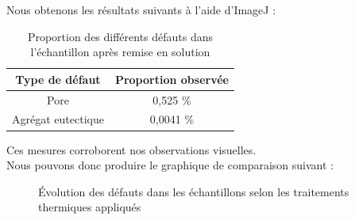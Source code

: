 Nous obtenons les résultats suivants à l'aide d'ImageJ :

\begin{table}[H]
    \centering
    \caption{Proportion des différents défauts dans l'échantillon après remise en solution}
    \begin{tabular}{c|c}
        \textbf{Type de défaut}  & \textbf{Proportion observée}  \\
        \hline
        Pore               & 0,525  \% \\
        Agrégat eutectique & 0,0041 \% \\
    \end{tabular}

\end{table}

Ces mesures corroborent nos observations visuelles.\\

Nous pouvons donc produire le graphique de comparaison suivant :


\begin{figure}[htbp]
    \centering
    
    \caption{Évolution des défauts dans les échantillons selon les traitements thermiques appliqués}
    \label{<label>}
\end{figure}

